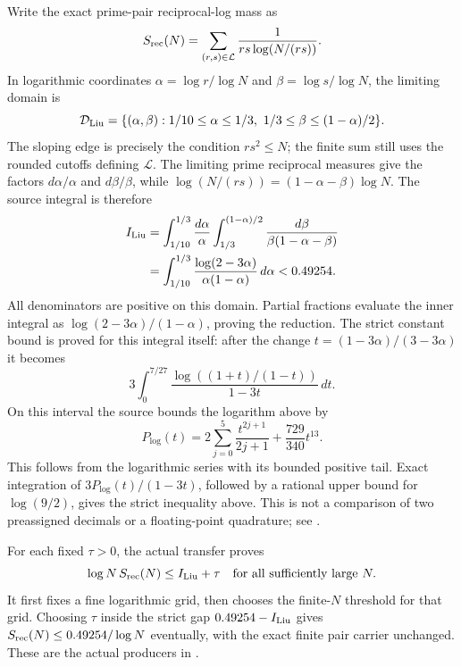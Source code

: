 Write the exact prime-pair reciprocal-log mass as
\[
 S_{\rm rec}(N)=\sum_{(r,s)\in\mathcal L}
       \frac{1}{rs\log(N/(rs))}.
\]
In logarithmic coordinates $\alpha=\log r/\log N$ and
$\beta=\log s/\log N$, the limiting domain is
\[
 \mathcal D_{\rm Liu}=\{(\alpha,\beta):1/10\le\alpha\le1/3,
                  \ 1/3\le\beta\le(1-\alpha)/2\}.
\]
The sloping edge is precisely the condition $rs^2\le N$;
the finite sum still uses the rounded cutoffs defining $\mathcal L$.
The limiting prime reciprocal measures give the factors $d\alpha/\alpha$
and $d\beta/\beta$, while
$\log(N/(rs))=(1-\alpha-\beta)\log N$. The source integral is therefore
\[\begin{aligned}
 I_{\rm Liu}
 &=\int_{1/10}^{1/3}\frac{d\alpha}{\alpha}
       \int_{1/3}^{(1-\alpha)/2}\frac{d\beta}{\beta(1-\alpha-\beta)}\\
 &=\int_{1/10}^{1/3}
       \frac{\log(2-3\alpha)}{\alpha(1-\alpha)}\,d\alpha
 <0.49254.
\end{aligned}\]
All denominators are positive on this domain. Partial fractions evaluate
the inner integral as $\log(2-3\alpha)/(1-\alpha)$, proving the reduction.
The strict constant bound is proved for this integral itself: after the
change $t=(1-3\alpha)/(3-3\alpha)$ it becomes
\[
 3\int_0^{7/27}\frac{\log((1+t)/(1-t))}{1-3t}\,dt.
\]
On this interval the source bounds the logarithm above by
\[
 P_{\log}(t)=2\sum_{j=0}^{5}\frac{t^{2j+1}}{2j+1}
                    +\frac{729}{340}t^{13}.
\]
This follows from the logarithmic series with its bounded positive tail.
Exact integration of $3P_{\log}(t)/(1-3t)$, followed by a rational upper
bound for $\log(9/2)$, gives the strict inequality above. This is not a
comparison of two preassigned decimals or a floating-point quadrature;
see .

For each fixed $\tau>0$, the actual transfer proves
\[
 \log N\,S_{\rm rec}(N)\le I_{\rm Liu}+\tau
 \quad\hbox{for all sufficiently large }N.
\]
It first fixes a fine logarithmic grid, then chooses the finite-$N$
threshold for that grid. Choosing $\tau$ inside the strict gap
$0.49254-I_{\rm Liu}$ gives $S_{\rm rec}(N)\le0.49254/\log N$
eventually, with the exact finite pair carrier unchanged. These are the
actual producers in
.

